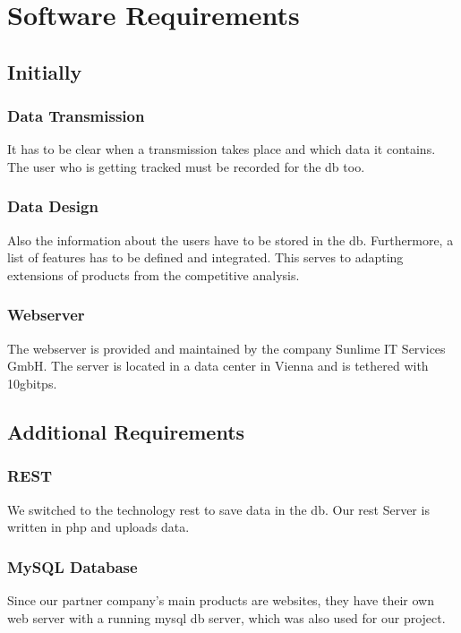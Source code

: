 \chapter{Software Requirements}
\section{Initially}
\subsection{Data Transmission}
It has to be clear when a transmission takes place and which data it contains. The user who is getting tracked must be recorded for the \gls{db} too.
\subsection{Data Design}
Also the information about the users have to be stored in the \gls{db}. Furthermore, a list of features has to be defined and integrated. This serves to adapting extensions of products from the competitive analysis.
\subsection{Webserver}
The webserver is provided and maintained by the company Sunlime IT Services GmbH. The server is located in a data center in Vienna and is tethered with 10\gls{gbitps}.
\section{Additional Requirements}
\subsection{REST}
We switched to the technology \gls{rest} to save data in the \gls{db}. Our \gls{rest} Server is written in \gls{php} and uploads data.
\subsection{MySQL Database}
Since our partner company's main products are websites, they have their own web server with a running \gls{mysql} \gls{db} server, which was also used for our project.
\clearpageauthor

